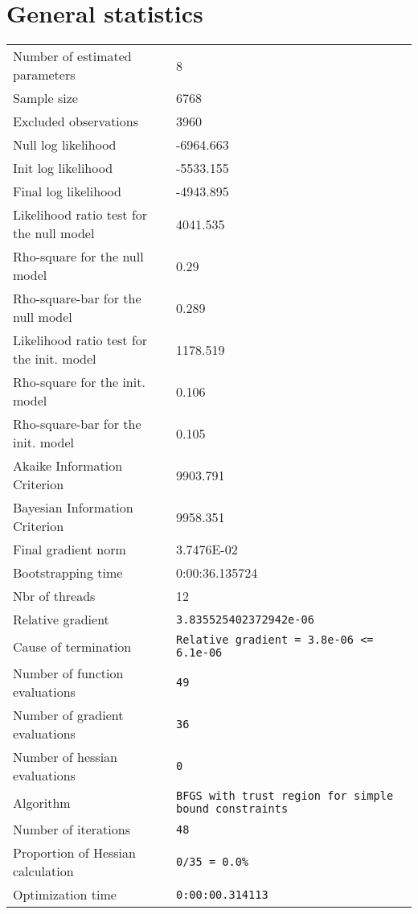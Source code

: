 \section{General statistics}
\begin{tabular}{ll}
Number of estimated parameters & 8 \\
Sample size & 6768 \\
Excluded observations & 3960 \\
Null log likelihood & -6964.663 \\
Init log likelihood & -5533.155 \\
Final log likelihood & -4943.895 \\
Likelihood ratio test for the null model & 4041.535 \\
Rho-square for the null model & 0.29 \\
Rho-square-bar for the null model & 0.289 \\
Likelihood ratio test for the init. model & 1178.519 \\
Rho-square for the init. model & 0.106 \\
Rho-square-bar for the init. model & 0.105 \\
Akaike Information Criterion & 9903.791 \\
Bayesian Information Criterion & 9958.351 \\
Final gradient norm & 3.7476E-02 \\
Bootstrapping time & 0:00:36.135724 \\
Nbr of threads & 12 \\
Relative gradient & \verb$3.835525402372942e-06$ \\
Cause of termination & \verb$Relative gradient = 3.8e-06 <= 6.1e-06$ \\
Number of function evaluations & \verb$49$ \\
Number of gradient evaluations & \verb$36$ \\
Number of hessian evaluations & \verb$0$ \\
Algorithm & \verb$BFGS with trust region for simple bound constraints$ \\
Number of iterations & \verb$48$ \\
Proportion of Hessian calculation & \verb$0/35 = 0.0%$ \\
Optimization time & \verb$0:00:00.314113$ \\
\end{tabular}

